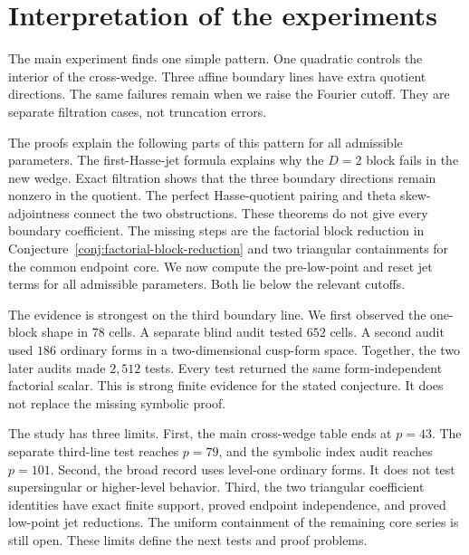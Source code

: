 \section{Interpretation of the experiments}
\label{sec:experimental-interpretation}

The main experiment finds one simple pattern.  One quadratic controls the
interior of the cross-wedge.  Three affine boundary lines have extra quotient
directions.  The same failures remain when we raise the Fourier cutoff.  They
are separate filtration cases, not truncation errors.

The proofs explain the following parts of this pattern for all admissible
parameters.  The first-Hasse-jet formula explains why the $D=2$ block fails
in the new wedge.  Exact filtration shows that the three boundary directions
remain nonzero in the quotient.  The perfect Hasse-quotient pairing and theta
skew-adjointness connect the two obstructions.  These theorems do not give
every boundary coefficient.  The missing steps are the factorial block
reduction in Conjecture~\ref{conj:factorial-block-reduction} and two
triangular containments for the common endpoint core.  We now compute the
pre-low-point and reset jet terms for all admissible parameters.  Both lie
below the relevant cutoffs.

The evidence is strongest on the third boundary line.  We first observed the
one-block shape in $78$ cells.  A separate blind audit tested $652$ cells.  A
second audit used $186$ ordinary forms in a two-dimensional cusp-form space.
Together, the two later audits made $2{,}512$ tests.  Every test returned the
same form-independent factorial scalar.  This is strong finite evidence for
the stated conjecture.  It does not replace the missing symbolic proof.

The study has three limits.  First, the main cross-wedge table ends at
$p=43$.  The separate third-line test reaches $p=79$, and the symbolic index
audit reaches $p=101$.  Second, the broad record uses level-one ordinary
forms.  It does not test supersingular or higher-level behavior.  Third, the
two triangular coefficient identities have exact finite support, proved
endpoint independence, and proved low-point jet reductions.  The uniform
containment of the remaining core series is still open.  These limits define
the next tests and proof problems.
